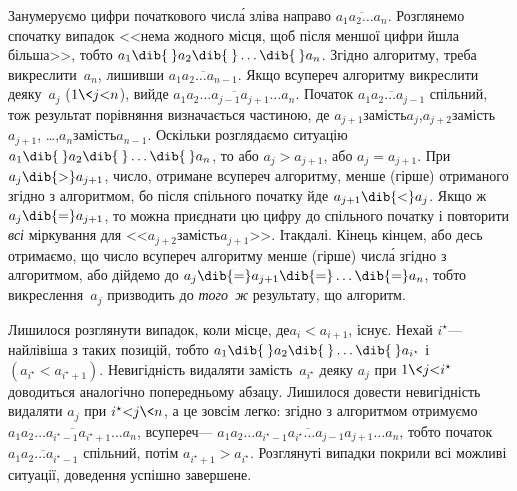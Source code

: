 \label{text:proof-max-num-by-strike-out-one-digit}
Занумеруємо цифри початкового числ\'{а} зліва направо $\overline{a_1a_2\dots{}a_n}$.
Розглянемо спочатку випадок <<нема жодного місця, щоб після меншої цифри йшла більша>>, тобто $a_1\dib{{\>}}a_2\dib{{\>}}\dots\dib{{\>}}a_n$. Згідно алгоритму, треба викреслити~$a_n$, лишивши $\overline{a_1a_2\dots{}a_{n-1}}$. Якщо всупереч алгоритму викреслити деяку~$a_j$ ($1{\<}j{<}n$), вийде $\overline{a_1a_2\dots{}a_{j-1}a_{j+1}\dots{}a_{n}}$. Початок $\overline{a_1a_2\dots{}a_{j-1}}$ спільний, 
тож результат порівняння визначається частиною, де
$a_{j+1}$\nolinebreak[1] замість\nolinebreak[3] $a_j$,\linebreak[1] 
$a_{j+2}$\nolinebreak[2] замість\nolinebreak[3] $a_{j+1}$,
\dots,\linebreak[1]
$a_{n}$\nolinebreak[2] замість\nolinebreak[3] $a_{n-1}$.
Оскільки розглядаємо ситуацію $a_1\dib{{\>}}a_2\dib{{\>}}\dots\dib{{\>}}a_n$, то або ${a_j{>}a_{j+1}}$, або ${a_j{=}a_{j+1}}$. При $a_j\dib{{>}}a_{j+1}$, число, отримане всупереч алгоритму, менше (гірше) отриманого згідно з алгоритмом, бо після спільного початку йде $a_{j+1}\dib{{<}}a_j$. Якщо ж $a_j\dib{{=}}a_{j+1}$, то можна приєднати цю цифру до спільного початку і повторити \emph{всі} міркування для <<$a_{j+2}$\nolinebreak[1] замість\nolinebreak[3] $a_{j+1}$>>. І\nolinebreak[3] так\nolinebreak[2] \mbox{далі}. Кінець кінцем, або десь отримаємо, що число всупереч алгоритму менше (гірше) числ\'{а} згідно з алгоритмом, або дійдемо до $a_j\dib{{=}}a_{j+1}\dib{{=}}\dots\dib{{=}}a_n$, тобто викреслення~$a_j$ призводить до \emph{того~ж} результату, що алгоритм. 

Лишилося розглянути випадок, коли місце, де\nolinebreak[3] $a_i{<}a_{i+1}$, існує. Нехай $i^{\star}$\nolinebreak[3] --- найлівіша з таких позицій, тобто $a_1\dib{{\>}}a_2\dib{{\>}}\dots\dib{{\>}}a_{i^{\star}}$ і $(a_{i^{\star}}{<}a_{i^{\star}+1})$. Невигідність видаляти замість~$a_{i^{\star}}$ деяку $a_j$ при $1{\<}j{<}i^{\star}$ доводиться аналогічно попередньому абзацу. Лишилося довести невигідність видаляти $a_j$ при $i^{\star}{<}j{\<}n$, а це зовсім легко: згідно з алгоритмом отримуємо $\overline{a_1a_2\dots{}a_{i^{\star}-1}a_{i^{\star}+1}\dots{}a_{n}}$, всупереч\nolinebreak[3] --- $\overline{a_1a_2\dots{}a_{i^{\star}-1}a_{i^{\star}}\dots{}a_{j-1}a_{j+1}\dots{}a_{n}}$, тобто початок $\overline{a_1a_2\dots{}a_{i^{\star}-1}}$ спільний, потім ${a_{i^{\star}+1} > a_{i^{\star}}}$. Розглянуті випадки покрили всі можливі ситуації, доведення успішно завершене.

